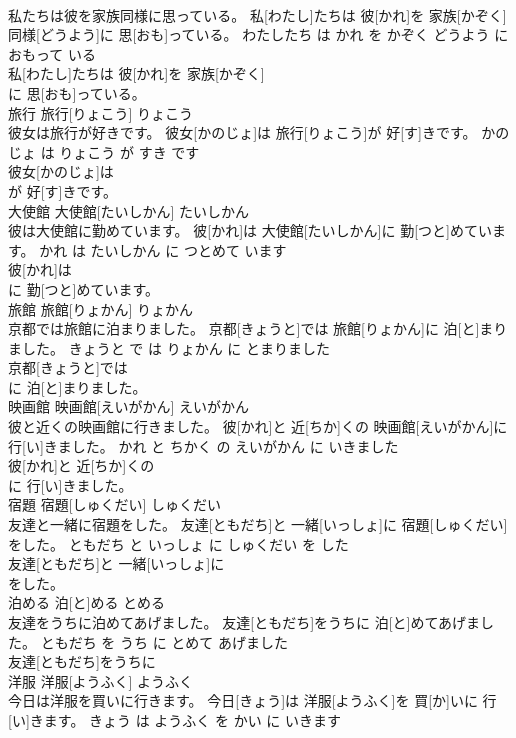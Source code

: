 \documentclass[8pt]{extreport}
\begin{document}
\begin{CJK}{UTF8}{min}
\\	私たちは彼を家族同様に思っている。	私[わたし]たちは 彼[かれ]を 家族[かぞく] 同様[どうよう]に 思[おも]っている。	わたしたち は かれ を かぞく どうよう に おもって いる	
\\	私[わたし]たちは 彼[かれ]を 家族[かぞく]
\\	に 思[おも]っている。			
\\	旅行	旅行[りょこう]	りょこう	
\\	彼女は旅行が好きです。	彼女[かのじょ]は 旅行[りょこう]が 好[す]きです。	かのじょ は りょこう が すき です	
\\	彼女[かのじょ]は
\\	が 好[す]きです。			
\\	大使館	大使館[たいしかん]	たいしかん	
\\	彼は大使館に勤めています。	彼[かれ]は 大使館[たいしかん]に 勤[つと]めています。	かれ は たいしかん に つとめて います	
\\	彼[かれ]は
\\	に 勤[つと]めています。			
\\	旅館	旅館[りょかん]	りょかん	
\\	京都では旅館に泊まりました。	京都[きょうと]では 旅館[りょかん]に 泊[と]まりました。	きょうと で は りょかん に とまりました	
\\	京都[きょうと]では
\\	に 泊[と]まりました。			
\\	映画館	映画館[えいがかん]	えいがかん	
\\	彼と近くの映画館に行きました。	彼[かれ]と 近[ちか]くの 映画館[えいがかん]に 行[い]きました。	かれ と ちかく の えいがかん に いきました	
\\	彼[かれ]と 近[ちか]くの
\\	に 行[い]きました。			
\\	宿題	宿題[しゅくだい]	しゅくだい	
\\	友達と一緒に宿題をした。	友達[ともだち]と 一緒[いっしょ]に 宿題[しゅくだい]をした。	ともだち と いっしょ に しゅくだい を した	
\\	友達[ともだち]と 一緒[いっしょ]に
\\	をした。			
\\	泊める	泊[と]める	とめる	
\\	友達をうちに泊めてあげました。	友達[ともだち]をうちに 泊[と]めてあげました。	ともだち を うち に とめて あげました	
\\	友達[ともだち]をうちに
\\	洋服	洋服[ようふく]	ようふく	
\\	今日は洋服を買いに行きます。	今日[きょう]は 洋服[ようふく]を 買[か]いに 行[い]きます。	きょう は ようふく を かい に いきます	

\end{CJK}
\end{document}
